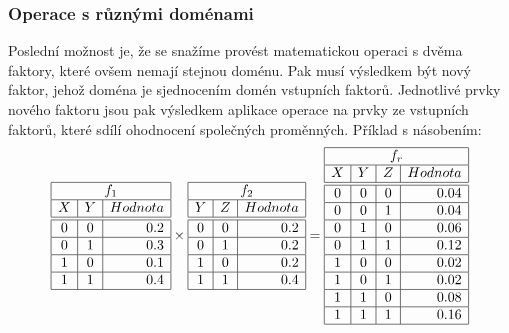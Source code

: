 \subsubsection{Operace s různými doménami}

Poslední možnost je, že se snažíme provést matematickou operaci s dvěma faktory, které ovšem nemají stejnou doménu.
Pak musí výsledkem být nový faktor, jehož doména je sjednocením domén vstupních faktorů.
Jednotlivé prvky nového faktoru jsou pak výsledkem aplikace operace na prvky ze vstupních faktorů, které sdílí ohodnocení společných proměnných. 
Příklad s násobením:
\begin{equation*}
\begin{array}{|c|c|r|}
    \hline
    \multicolumn{3}{|c|}{f_1} \\
    \hline
    X & Y & Hodnota \\
    \hline
    \hline
    0 & 0 & 0.2 \\
    \hline
    0 & 1 & 0.3 \\
    \hline
    1 & 0 & 0.1 \\
    \hline
    1 & 1 & 0.4 \\
    \hline
\end{array}
\times
\begin{array}{|c|c|r|}
    \hline
    \multicolumn{3}{|c|}{f_2} \\
    \hline
    Y & Z & Hodnota \\
    \hline
    \hline
    0 & 0 & 0.2 \\
    \hline
    0 & 1 & 0.2 \\
    \hline
    1 & 0 & 0.2 \\
    \hline
    1 & 1 & 0.4 \\
    \hline
\end{array}
=
\begin{array}{|c|c|c|r|}
    \hline
    \multicolumn{4}{|c|}{f_r} \\
    \hline
    X & Y & Z & Hodnota \\
    \hline
    \hline
    0 & 0 & 0 & 0.04 \\
    \hline
    0 & 0 & 1 & 0.04 \\
    \hline
    0 & 1 & 0 & 0.06 \\
    \hline
    0 & 1 & 1 & 0.12 \\
    \hline
    1 & 0 & 0 & 0.02 \\
    \hline
    1 & 0 & 1 & 0.02 \\
    \hline
    1 & 1 & 0 & 0.08 \\
    \hline
    1 & 1 & 1 & 0.16\\
    \hline
\end{array}
\end{equation*}


